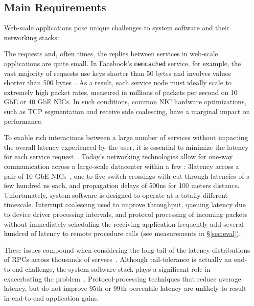 \subsection{Main Requirements}
\label{sec:motivation:challenges}

Web-scale applications pose unique challenges to system
software and their networking stacks:


 The requests and, often times, the
replies between services in web-scale applications are quite small. In
Facebook's \texttt{memcached} service, for example, the vast majority
of requests use keys shorter than 50 bytes and involves values shorter
than 500 bytes~\cite{Atikoglu:2012:WAL}. As a result, each service
node must ideally scale to extremely high packet rates, measured in
millions of packets per second on 10 GbE or 40 GbE NICs.  In such
conditions, common NIC hardware optimizations, such as TCP
segmentation and receive side coalescing, have a marginal impact on
performance.

 To enable rich interactions
between a large number of services
without impacting the overall latency experienced by the user, it is essential
to minimize the latency for each service
request~\cite{luiz-isscc,DBLP:conf/hotos/RumbleOSRO11}. Today's networking technologies
allow for one-way communication across a large-scale datacenter within
a few \microsecond: 3\microsecond latency across a pair of 10 GbE
NICs~\cite{cisco-sereno}, one to five switch crossings with
cut-through latencies of a few hundred ns each, and propagation delays
of 500ns for 100 meters distance. Unfortunately, system software is
designed to operate at a totally different timescale. Interrupt
coalescing used to improve throughput, queuing latency due to device
driver processing intervals, and protocol processing of incoming
packets without immediately scheduling the receiving application
frequently add several hundred \microsecond of latency to remote
procedure calls (see measurements in \S\ref{sec:eval}).


These issues compound when considering the long tail of the latency
distributions of RPCs across thousands of
servers~\cite{DBLP:journals/cacm/DeanB13}. Although tail-tolerance is
actually an end-to-end challenge, the system software stack plays a
significant role in exacerbating the
problem~\cite{DBLP:conf/eurosys/LeverichK14}.  Protocol-processing techniques
that reduce average latency, but do not improve 95th or 99th
percentile latency are unlikely to result in end-to-end application
gains.

